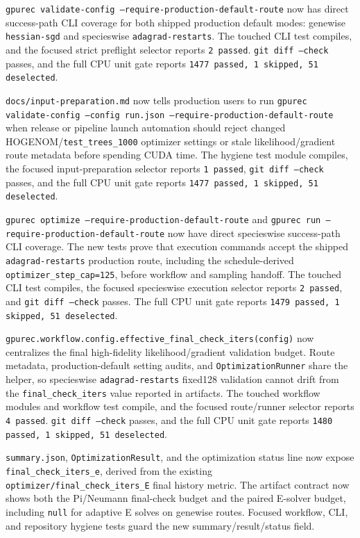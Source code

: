 \documentclass[11pt]{article}
\begin{document}
\texttt{gpurec validate-config --require-production-default-route} now has
direct success-path CLI coverage for both shipped production default modes:
genewise \texttt{hessian-sgd} and specieswise \texttt{adagrad-restarts}.  The
touched CLI test compiles, and the focused strict preflight selector reports
\texttt{2 passed}.  \texttt{git diff --check} passes, and the full CPU unit
gate reports \texttt{1477 passed, 1 skipped, 51 deselected}.

\texttt{docs/input-preparation.md} now tells production users to run
\texttt{gpurec validate-config --config run.json --require-production-default-route}
when release or pipeline launch automation should reject changed
HOGENOM/\texttt{test\_trees\_1000} optimizer settings or stale
likelihood/gradient route metadata before spending CUDA time.  The hygiene test
module compiles, the focused input-preparation selector reports
\texttt{1 passed}, \texttt{git diff --check} passes, and the full CPU unit
gate reports \texttt{1477 passed, 1 skipped, 51 deselected}.

\texttt{gpurec optimize --require-production-default-route} and
\texttt{gpurec run --require-production-default-route} now have direct
specieswise success-path CLI coverage.  The new tests prove that execution
commands accept the shipped \texttt{adagrad-restarts} production route,
including the schedule-derived \texttt{optimizer\_step\_cap=125}, before
workflow and sampling handoff.  The touched CLI test compiles, the focused
specieswise execution selector reports \texttt{2 passed}, and
\texttt{git diff --check} passes.  The full CPU unit gate reports
\texttt{1479 passed, 1 skipped, 51 deselected}.

\texttt{gpurec.workflow.config.effective\_final\_check\_iters(config)} now
centralizes the final high-fidelity likelihood/gradient validation budget.
Route metadata, production-default setting audits, and
\texttt{OptimizationRunner} share the helper, so specieswise
\texttt{adagrad-restarts} fixed128 validation cannot drift from the
\texttt{final\_check\_iters} value reported in artifacts.  The touched workflow
modules and workflow test compile, and the focused route/runner selector reports
\texttt{4 passed}.  \texttt{git diff --check} passes, and the full CPU unit gate
reports \texttt{1480 passed, 1 skipped, 51 deselected}.

\texttt{summary.json}, \texttt{OptimizationResult}, and the optimization
status line now expose \texttt{final\_check\_iters\_e}, derived from the
existing \texttt{optimizer/final\_check\_iters\_E} final history metric.  The
artifact contract now shows both the Pi/Neumann final-check budget and the
paired E-solver budget, including \texttt{null} for adaptive E solves on
genewise routes.  Focused workflow, CLI, and repository hygiene tests guard the
new summary/result/status field.
\end{document}
